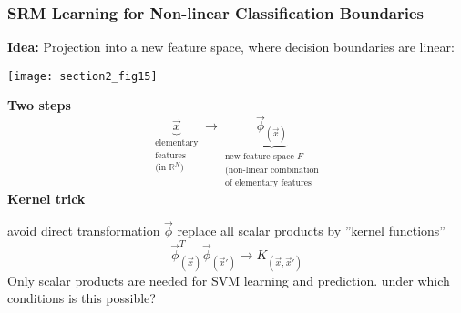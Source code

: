 \subsubsection{SRM Learning for Non-linear Classification Boundaries}
\textbf{Idea:} Projection into a new feature space, where decision
boundaries are linear:
\begin{center} \texttt{[image: section2\_fig15]} \end{center}
{\bf Two steps}
\begin{equation} \tag{"intelligent" preprocessing}
	\underbrace{ \vec{x} }_{\substack{\text{elementary} \\
					\text{features} \\
					\text{(in } \mathbb{R}^N \text{)}}}
	\longrightarrow \underbrace{ \vec{\phi}_{(\vec{x})} }_{
			\substack{ \text{new feature space } F \\
				\text{(non-linear combination} \\
				\text{of elementary features}}}
\end{equation}
{\bf Kernel trick}
\begin{itemize}
	\itR avoid direct transformation $\vec{\phi}$
	\itR replace all scalar products by ''kernel functions''
	\[ \vec{\phi}_{(\vec{x})}^T \vec{\phi}_{(\vec{x}')} \rightarrow
		K_{(\vec{x}, \vec{x}')} \]
		Only scalar products are needed for SVM learning and 
		prediction.
              \itR under which conditions is this possible?
\end{itemize}

